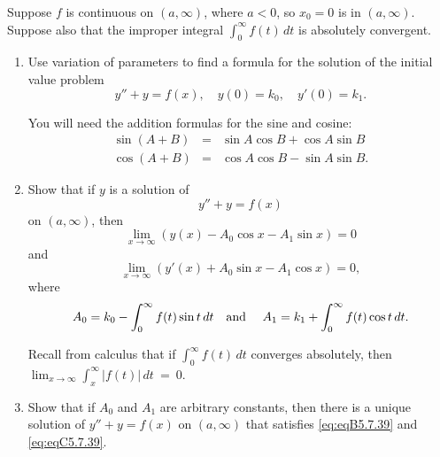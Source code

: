 \documentclass{ximera}
\begin{document}
\begin{problem}\label{exer:5.7.39}
Suppose $f$ is continuous on
$(a,\infty)$, where $a<0$, so $x_0=0$ is in $(a,\infty)$.  Suppose also that the improper
integral
$\int_{0}^\infty f(t)\,dt$ is absolutely convergent.

\begin{enumerate}
\item %
Use variation of parameters to
find a formula for the solution of the initial value problem
$$
y''+y=f(x), \quad  y(0)=k_0,\quad y'(0)=k_1.
$$
\begin{hint}
    You will need the addition formulas for the sine and cosine:
\begin{eqnarray*}
\sin(A+B)&=&\sin A\cos B+\cos A\sin B\\
\cos(A+B)&=&\cos A\cos B-\sin A\sin B.
\end{eqnarray*}
\end{hint}

\item %
Show that if $y$ is a solution of
\begin{equation}\label{eq:eqA5.7.39}
y''+y=f(x)
\end{equation}
 on $(a,\infty)$, then
\begin{equation}\label{eq:eqB5.7.39}
\lim_{x \to \infty}\left(y(x)-A_0\cos x-A_1\sin x\right)=0
\end{equation}
and
\begin{equation}\label{eq:eqC5.7.39}
\lim_{x\to\infty}\left(y'(x)+A_0\sin x-A_1\cos x\right)=0,
\end{equation}
where
$$
A_0=k_0-\int_0^\infty f(t)\sin t\,dt\mbox{\quad and \quad}
A_1=k_1+\int_0^\infty f(t)\cos t\,dt.
$$
\begin{hint}
   Recall from calculus that if $\int_0^\infty f(t)\,dt$
converges absolutely, then $\lim_{x\to\infty}\int_x^\infty
|f(t)|\,dt~=~0$. 
\end{hint}

\item %
Show that if $A_0$ and $A_1$ are arbitrary constants, then there is a
unique solution of $y''+y=f(x)$ on $(a,\infty)$ that satisfies
\ref{eq:eqB5.7.39}  and \ref{eq:eqC5.7.39}.
\end{enumerate}
\end{problem}
\end{document}
